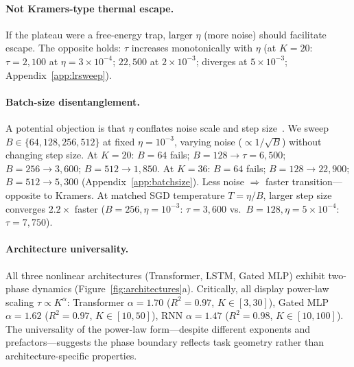 \documentclass{article}
\begin{document}
\paragraph{Not Kramers-type thermal escape.}
If the plateau were a free-energy trap, larger $\eta$ (more noise) should facilitate escape.
The opposite holds: $\tau$ increases monotonically with $\eta$ (at $K{=}20$: $\tau = 2{,}100$ at $\eta = 3{\times}10^{-4}$; $22{,}500$ at $2{\times}10^{-3}$; diverges at $5{\times}10^{-3}$; Appendix~\ref{app:lrsweep}).

\paragraph{Batch-size disentanglement.}
\label{sec:batch-size}
A potential objection is that $\eta$ conflates noise scale and step size~\citep{smith2018dont}.
We sweep $B \in \{64, 128, 256, 512\}$ at fixed $\eta = 10^{-3}$, varying noise ($\propto 1/\sqrt{B}$) without changing step size.
At $K{=}20$: $B{=}64$ fails; $B{=}128 \to \tau{=}6{,}500$; $B{=}256 \to 3{,}600$; $B{=}512 \to 1{,}850$.
At $K{=}36$: $B{=}64$ fails; $B{=}128 \to 22{,}900$; $B{=}512 \to 5{,}300$ (Appendix~\ref{app:batchsize}).
Less noise $\Rightarrow$ faster transition---opposite to Kramers.
At matched SGD temperature $T{=}\eta/B$, larger step size converges $2.2\times$ faster ($B{=}256, \eta{=}10^{-3}$: $\tau{=}3{,}600$ vs.\ $B{=}128, \eta{=}5{\times}10^{-4}$: $\tau{=}7{,}750$).

\paragraph{Architecture universality.}
\label{sec:architecture}
All three nonlinear architectures (Transformer, LSTM, Gated MLP) exhibit two-phase dynamics (Figure~\ref{fig:architectures}a).
Critically, all display power-law scaling $\tau \propto K^\alpha$: Transformer $\alpha{=}1.70$ ($R^2{=}0.97$, $K {\in} [3, 30]$), Gated MLP $\alpha{=}1.62$ ($R^2{=}0.97$, $K {\in} [10, 50]$), RNN $\alpha{=}1.47$ ($R^2{=}0.98$, $K {\in} [10, 100]$).
The universality of the power-law form---despite different exponents and prefactors---suggests the phase boundary reflects task geometry rather than architecture-specific properties.
\end{document}
